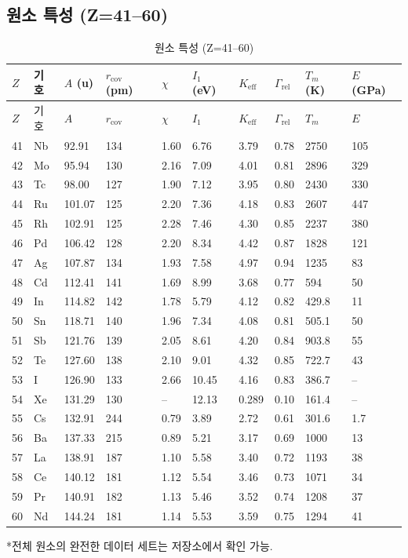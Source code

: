 \documentclass[12pt,a4paper]{article}
\newcommand{\Keff}{K_{\mathrm{eff}}}
\begin{document}
	\subsection*{원소 특성 (Z=41–60)}
	
	\begin{longtable}{p{0.6cm}p{1.2cm}p{1.2cm}p{1.2cm}p{1.2cm}p{1.2cm}p{1.5cm}p{1.2cm}p{1.2cm}p{1.2cm}}
		\caption{원소 특성 (Z=41–60)} \label{tab:elem-data-41to60} \\
		\toprule
		\(Z\) & 기호 & \(A\) (u) & \(r_{\text{cov}}\) (pm) & \(\chi\) & \(I_1\) (eV) & \(\Keff\) & \(\Gamma_{\text{rel}}\) & \(T_m\) (K) & \(E\) (GPa) \\
		\midrule
		\endfirsthead
		\toprule
		\(Z\) & 기호 & \(A\) & \(r_{\text{cov}}\) & \(\chi\) & \(I_1\) & \(\Keff\) & \(\Gamma_{\text{rel}}\) & \(T_m\) & \(E\) \\
		\midrule
		\endhead
		41 & Nb & 92.91 & 134 & 1.60 & 6.76 & 3.79 & 0.78 & 2750 & 105 \\
		42 & Mo & 95.94 & 130 & 2.16 & 7.09 & 4.01 & 0.81 & 2896 & 329 \\
		43 & Tc & 98.00 & 127 & 1.90 & 7.12 & 3.95 & 0.80 & 2430 & 330 \\
		44 & Ru & 101.07 & 125 & 2.20 & 7.36 & 4.18 & 0.83 & 2607 & 447 \\
		45 & Rh & 102.91 & 125 & 2.28 & 7.46 & 4.30 & 0.85 & 2237 & 380 \\
		46 & Pd & 106.42 & 128 & 2.20 & 8.34 & 4.42 & 0.87 & 1828 & 121 \\
		47 & Ag & 107.87 & 134 & 1.93 & 7.58 & 4.97 & 0.94 & 1235 & 83 \\
		48 & Cd & 112.41 & 141 & 1.69 & 8.99 & 3.68 & 0.77 & 594 & 50 \\
		49 & In & 114.82 & 142 & 1.78 & 5.79 & 4.12 & 0.82 & 429.8 & 11 \\
		50 & Sn & 118.71 & 140 & 1.96 & 7.34 & 4.08 & 0.81 & 505.1 & 50 \\
		51 & Sb & 121.76 & 139 & 2.05 & 8.61 & 4.20 & 0.84 & 903.8 & 55 \\
		52 & Te & 127.60 & 138 & 2.10 & 9.01 & 4.32 & 0.85 & 722.7 & 43 \\
		53 & I  & 126.90 & 133 & 2.66 & 10.45 & 4.16 & 0.83 & 386.7 & – \\
		54 & Xe & 131.29 & 130 & –    & 12.13 & 0.289 & 0.10 & 161.4 & – \\
		55 & Cs & 132.91 & 244 & 0.79 & 3.89 & 2.72 & 0.61 & 301.6 & 1.7 \\
		56 & Ba & 137.33 & 215 & 0.89 & 5.21 & 3.17 & 0.69 & 1000 & 13 \\
		57 & La & 138.91 & 187 & 1.10 & 5.58 & 3.40 & 0.72 & 1193 & 38 \\
		58 & Ce & 140.12 & 181 & 1.12 & 5.54 & 3.46 & 0.73 & 1071 & 34 \\
		59 & Pr & 140.91 & 182 & 1.13 & 5.46 & 3.52 & 0.74 & 1208 & 37 \\
		60 & Nd & 144.24 & 181 & 1.14 & 5.53 & 3.59 & 0.75 & 1294 & 41 \\
		\bottomrule
	\end{longtable}
	*전체 원소의 완전한 데이터 세트는 저장소에서 확인 가능.
	
\end{document}
